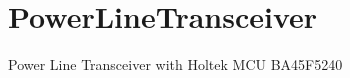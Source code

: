\chapter{Power\+Line\+Transceiver}
\hypertarget{md__r_e_a_d_m_e}{}\label{md__r_e_a_d_m_e}
\label{md__r_e_a_d_m_e_autotoc_md0}%
%
Power Line Transceiver with Holtek MCU BA45\+F5240 